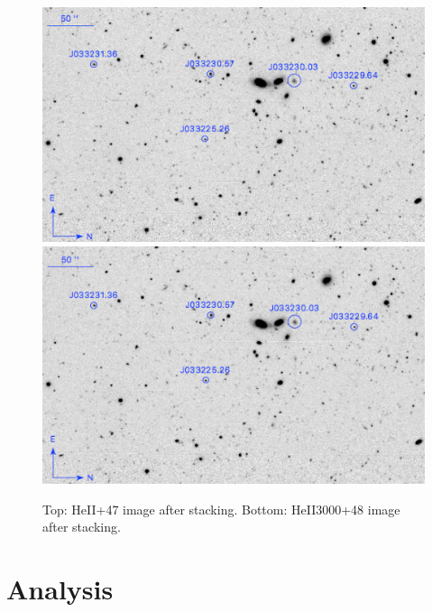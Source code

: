 \documentclass[twocolumn]{aastex6}
\begin{document}
\begin{figure}[ht!]
\centering
\includegraphics[scale=.61]{HEII_final.png}
\includegraphics[scale=.61]{HEII3000_final.png}
\caption{Top: HeII+47 image after stacking. Bottom: HeII3000+48 image after stacking. }
\label{fig:stacked_image}
\end{figure}
\section{Analysis}
\end{document}
